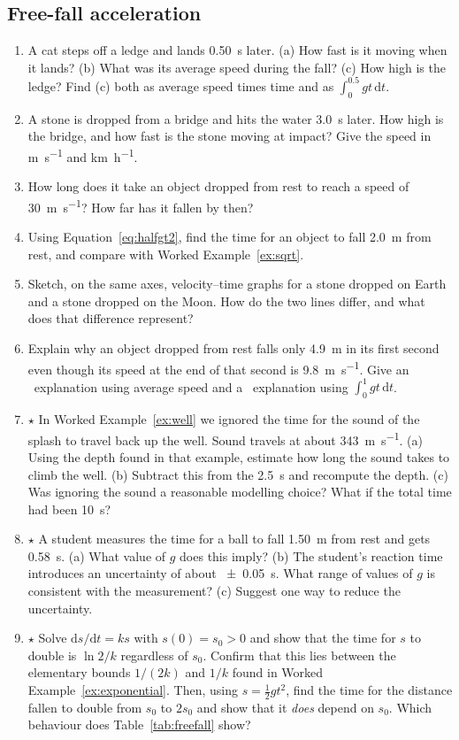 \documentclass[11pt,twoside,openany]{book}
\newcommand{\dd}{\mathrm{d}}
\newcommand{\viewtag}[3]{\fcolorbox{#2}{#3}{\footnotesize\textbf{\textcolor{#2}{#1}}}}
\newcommand{\elemtag}{\viewtag{Elementary}{elemcol}{elempale}}
\newcommand{\calctag}{\viewtag{Calculus}{calccol}{calcpale}}
\begin{document}
\subsection*{Free-fall acceleration}
\begin{enumerate}[label=\textbf{\thechapter.\arabic*},resume=exercises,leftmargin=*]
  \item A cat steps off a ledge and lands \SI{0.50}{\second} later. (a) How fast is it moving when it lands? (b) What was its average speed during the fall? (c) How high is the ledge? Find (c) both as average speed times time and as $\int_0^{0.5} gt\,\dd t$.
  \item A stone is dropped from a bridge and hits the water \SI{3.0}{\second} later. How high is the bridge, and how fast is the stone moving at impact? Give the speed in \si{\metre\per\second} and \si{\kilo\metre\per\hour}.
  \item How long does it take an object dropped from rest to reach a speed of \SI{30}{\metre\per\second}? How far has it fallen by then?
  \item Using Equation~\eqref{eq:halfgt2}, find the time for an object to fall \SI{2.0}{\metre} from rest, and compare with Worked Example~\ref{ex:sqrt}.
  \item Sketch, on the same axes, velocity--time graphs for a stone dropped on Earth and a stone dropped on the Moon. How do the two lines differ, and what does that difference represent?
  \item Explain why an object dropped from rest falls only \SI{4.9}{\metre} in its first second even though its speed at the end of that second is \SI{9.8}{\metre\per\second}. Give an \elemtag\ explanation using average speed and a \calctag\ explanation using $\int_0^1 gt\,\dd t$.
  \item $\star$ In Worked Example~\ref{ex:well} we ignored the time for the sound of the splash to travel back up the well. Sound travels at about \SI{343}{\metre\per\second}. (a) Using the depth found in that example, estimate how long the sound takes to climb the well. (b) Subtract this from the \SI{2.5}{\second} and recompute the depth. (c) Was ignoring the sound a reasonable modelling choice? What if the total time had been \SI{10}{\second}?\label{ex:wellsound}
  \item $\star$ A student measures the time for a ball to fall \SI{1.50}{\metre} from rest and gets \SI{0.58}{\second}. (a) What value of $g$ does this imply? (b) The student's reaction time introduces an uncertainty of about \SI{\pm 0.05}{\second}. What range of values of $g$ is consistent with the measurement? (c) Suggest one way to reduce the uncertainty.
  \item $\star$ Solve $\dd s/\dd t = ks$ with $s(0) = s_0 > 0$ and show that the time for $s$ to double is $\ln 2/k$ regardless of $s_0$. Confirm that this lies between the elementary bounds $1/(2k)$ and $1/k$ found in Worked Example~\ref{ex:exponential}. Then, using $s = \tfrac12 g t^2$, find the time for the distance fallen to double from $s_0$ to $2s_0$ and show that it \emph{does} depend on $s_0$. Which behaviour does Table~\ref{tab:freefall} show?
\end{enumerate}
\end{document}
